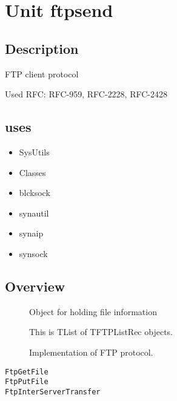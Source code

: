 \documentclass{report}
\begin{document}
\chapter{Unit ftpsend}
\label{ftpsend}
\section{Description}
FTP client protocol\hfill\vspace*{1ex}



Used RFC: RFC{-}959, RFC{-}2228, RFC{-}2428
\section{uses}
\begin{itemize}
\item \begin{ttfamily}SysUtils\end{ttfamily}\item \begin{ttfamily}Classes\end{ttfamily}\item \begin{ttfamily}blcksock\end{ttfamily}\item \begin{ttfamily}synautil\end{ttfamily}\item \begin{ttfamily}synaip\end{ttfamily}\item \begin{ttfamily}synsock\end{ttfamily}\end{itemize}
\section{Overview}
\begin{description}
\item[\texttt{\begin{ttfamily}TFTPListRec\end{ttfamily} Class}]Object for holding file information
\item[\texttt{\begin{ttfamily}TFTPList\end{ttfamily} Class}]This is TList of TFTPListRec objects.
\item[\texttt{\begin{ttfamily}TFTPSend\end{ttfamily} Class}]Implementation of FTP protocol.
\end{description}
\begin{description}
\item[\texttt{FtpGetFile}]
\item[\texttt{FtpPutFile}]
\item[\texttt{FtpInterServerTransfer}]
\end{description}
\end{document}
